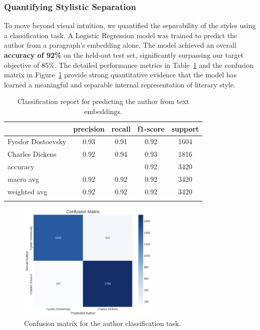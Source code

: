 \documentclass[sn-mathphys]{sn-jnl}%
\begin{document}
\subsubsection{Quantifying Stylistic Separation}\label{subsubsec3.1.2}
To move beyond visual intuition, we quantified the separability of the styles using a classification task. A Logistic Regression model was trained to predict the author from a paragraph's embedding alone. The model achieved an overall \textbf{accuracy of 92\%} on the held-out test set, significantly surpassing our target objective of 85\%. The detailed performance metrics in Table~\ref{tab:classification_report} and the confusion matrix in Figure~\ref{fig:confusion_matrix} provide strong quantitative evidence that the model has learned a meaningful and separable internal representation of literary style.

\begin{table}[h]
\begin{center}
\begin{minipage}{\textwidth}
\caption{Classification report for predicting the author from text embeddings.}\label{tab:classification_report}
\begin{tabular*}{\textwidth}{@{\extracolsep{\fill}}lcccc@{\extracolsep{\fill}}}
\toprule
 & precision & recall & f1-score & support \\
\midrule
Fyodor Dostoevsky & 0.93 & 0.91 & 0.92 & 1604 \\
Charles Dickens   & 0.92 & 0.94 & 0.93 & 1816 \\
\midrule
accuracy & & & 0.92 & 3420 \\
macro avg & 0.92 & 0.92 & 0.92 & 3420 \\
weighted avg & 0.92 & 0.92 & 0.92 & 3420 \\
\botrule
\end{tabular*}
\end{minipage}
\end{center}
\end{table}

\begin{figure}[h]
    \centering
    \includegraphics[width=0.6\textwidth]{Confusion Matrix.png} %
    \caption{Confusion matrix for the author classification task.}\label{fig:confusion_matrix}
\end{figure}
\end{document}
